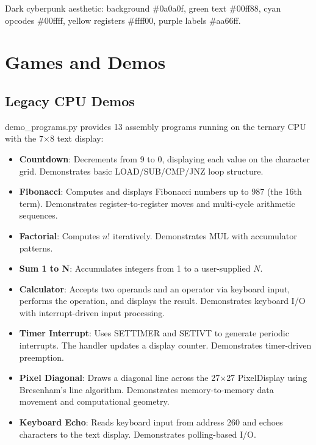 \documentclass[12pt,a4paper,twoside]{book}
\theoremstyle{trinarytheorem}
\theoremstyle{trinarydefinition}
\newcommand{\code}[1]{\textsf{#1}}
\begin{document}
Dark cyberpunk aesthetic: background \code{\#0a0a0f}, green text \code{\#00ff88},
cyan opcodes \code{\#00ffff}, yellow registers \code{\#ffff00}, purple labels
\code{\#aa66ff}.

\chapter{Games and Demos}
\label{ch:games}

\section{Legacy CPU Demos}

\code{demo\_programs.py} provides 13 assembly programs running on the ternary CPU
with the 7$\times$8 text display:

\begin{itemize}
    \item \textbf{Countdown}: Decrements from 9 to 0, displaying each value on the
          character grid. Demonstrates basic LOAD/SUB/CMP/JNZ loop structure.
    \item \textbf{Fibonacci}: Computes and displays Fibonacci numbers up to 987
          (the 16th term). Demonstrates register-to-register moves and multi-cycle
          arithmetic sequences.
    \item \textbf{Factorial}: Computes $n!$ iteratively. Demonstrates MUL with
          accumulator patterns.
    \item \textbf{Sum 1 to N}: Accumulates integers from 1 to a user-supplied $N$.
    \item \textbf{Calculator}: Accepts two operands and an operator via keyboard input,
          performs the operation, and displays the result. Demonstrates keyboard I/O
          with interrupt-driven input processing.
    \item \textbf{Timer Interrupt}: Uses SETTIMER and SETIVT to generate periodic
          interrupts. The handler updates a display counter. Demonstrates timer-driven
          preemption.
    \item \textbf{Pixel Diagonal}: Draws a diagonal line across the 27$\times$27
          PixelDisplay using Bresenham's line algorithm. Demonstrates memory-to-memory
          data movement and computational geometry.
    \item \textbf{Keyboard Echo}: Reads keyboard input from address 260 and echoes
          characters to the text display. Demonstrates polling-based I/O.
\end{itemize}
\end{document}
